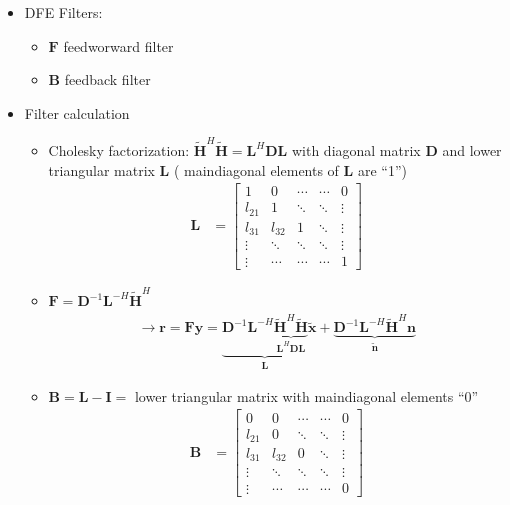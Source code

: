 \documentclass[a4paper, 10pt]{article}
\begin{document}
\begin{itemize}
	\item DFE Filters:
	\begin{itemize}
		\item $\mathbf{F}$ feedworward filter
		\item $\mathbf{B}$ feedback filter
	\end{itemize}
	\item Filter calculation
	\begin{itemize}
		\item Cholesky factorization: $\tilde{\mathbf{H}}^H \tilde{\mathbf{H}} = \mathbf{L}^H\mathbf{DL}$ with diagonal matrix $\mathbf{D}$
			and lower triangular matrix $\mathbf{L}$ ( maindiagonal elements of $\mathbf{L}$ are ``1'')
	\begin{align*}
			\mathbf{L} &= 
			\begin{bmatrix}
				1 & 0 & \cdots & \cdots & 0 \\
				l_{21} & 1 & \ddots & \ddots &	\vdots \\
				l_{31} & l_{32} & 1 & \ddots &\vdots \\
				\vdots & \ddots & \ddots & \ddots & \vdots\\
				\vdots & \cdots & \cdots & \cdots & 1
			\end{bmatrix}
	\end{align*}

		\item $\mathbf{F}=\mathbf{D}^{-1}\mathbf{L}^{-H}\tilde{\mathbf{H}}^H$
		\begin{align*}
			\rightarrow \mathbf{r}=\mathbf{Fy}=\underbrace{\mathbf{D}^{-1}\mathbf{L}^{-H}\underbrace{\tilde{\mathbf{H}}^H\tilde{\mathbf{H}}}_
			{\mathbf{L}^H\mathbf{DL}}}_{\mathbf{L}}\tilde{\mathbf{x}}+\underbrace{\mathbf{D}^{-1}\mathbf{L}^{-H}\tilde{\mathbf{H}}^H\mathbf{n}}_
			{\tilde{\mathbf{n}}}
		\end{align*}
		\item $\mathbf{B}=\mathbf{L-I}=$ lower triangular matrix with maindiagonal elements ``$0$''
	\begin{align*}
			\mathbf{B} &= 
			\begin{bmatrix}
				0 & 0 & \cdots & \cdots & 0 \\
				l_{21} & 0 & \ddots & \ddots &	\vdots \\
				l_{31} & l_{32} & 0 & \ddots &\vdots \\
				\vdots & \ddots & \ddots & \ddots & \vdots\\
				\vdots & \cdots & \cdots & \cdots & 0
			\end{bmatrix}
	\end{align*}


\end{itemize}
\end{itemize}
\end{document}
